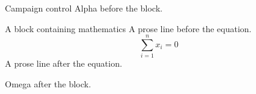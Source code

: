 \documentclass[10pt,aspectratio=169]{beamer}
\date{}
\begin{document}
\begin{frame}{Campaign control}
Alpha before the block.
\begin{block}{A block containing mathematics}
A prose line before the equation.
\[\sum_{i=1}^{n} x_i = 0\]
A prose line after the equation.
\end{block}
Omega after the block.
\end{frame}
\end{document}

